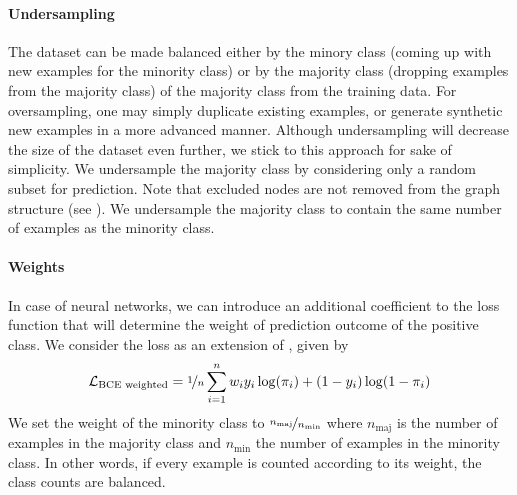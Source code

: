 \documentclass[
	fontsize=10pt, %
	twoside=false, %
	secnumdepth=1, %
  toc=indentunnumbered %
]{kaobook}
\begin{document}
\paragraph{Undersampling}
The dataset can be made balanced 
either by  the minory class (coming up with new examples for
the minority class) or by  the majority class (dropping
examples from the majority class) of the majority class from the training data.
For oversampling, one may simply duplicate existing examples, or generate
synthetic new examples in a more advanced manner. Although undersampling will
decrease the size of the dataset even further, we stick to this approach for
sake of simplicity.
%
We undersample the majority class by considering only a random subset for
prediction. Note that excluded nodes are not removed from the graph structure (see
). We undersample the majority class to contain
the same number of examples as the minority class.




\paragraph{Weights} In case of neural networks, we can introduce an additional
coefficient to the loss function that will determine the weight of prediction
outcome of the positive class.
%
We consider the  loss as
an extension of , given by
\begin{align}
  \label{eq:bce-loss-weighted}
  \mathcal{L}_{\text{BCE weighted}} = \nicefrac{1}{n} \sum_{i=1}^n w_i y_i \log(\pi_i) + (1-y_i) \log (1-\pi_i)
\end{align}
We set the weight of the minority class to
$\nicefrac{n_{\text{maj}}}{n_{\text{min}}}$ where $n_{\text{maj}}$ is the number
of examples in the majority
class and $n_{\text{min}}$ the number of examples in the minority class. In
other words, if every example is counted according to its weight, the class
counts are balanced.
\end{document}
